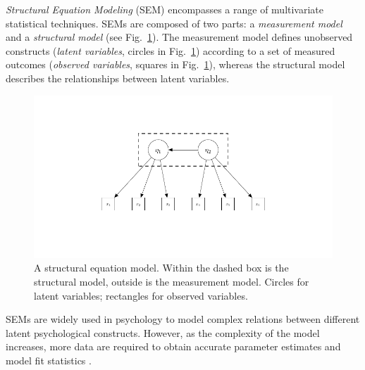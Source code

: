 \documentclass[graybox]{svmult}
\begin{document}
\emph{Structural Equation Modeling} (SEM) encompasses  a range of multivariate statistical techniques. SEMs are composed of two parts: a \emph{measurement model} and a \emph{structural model} (see Fig.~\ref{fig:example_sem}).   The measurement model defines unobserved constructs (\emph{latent variables}, circles in Fig.~\ref{fig:example_sem}) according to a set of measured outcomes (\emph{observed variables}, squares in Fig.~\ref{fig:example_sem}), whereas the structural model describes the relationships between latent variables.
\begin{figure}[b]
	\sidecaption
	\label{fig:example_sem}
	\includegraphics[width = .45\textwidth]{figure/Plot_SEM}
	\caption{A structural equation model. Within the dashed box is the structural model, outside is the measurement model. Circles for latent variables; rectangles for observed variables.}
\end{figure}
SEMs are widely used in psychology to model complex relations between different latent psychological constructs. However, as the complexity of the model increases, more data are required to obtain accurate parameter estimates and model fit statistics \cite{wolfSampleSizeRequirements2013}.
\end{document}
